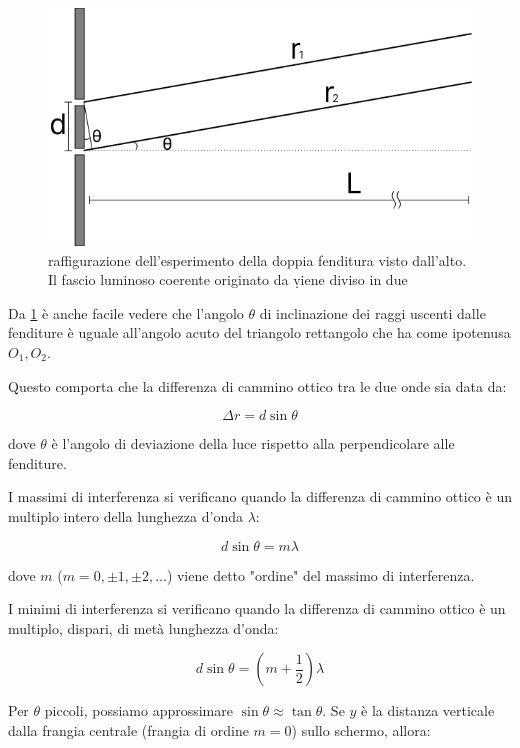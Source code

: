 \documentclass[12pt,a4paper]{report}
\begin{document}
\begin{figure}[!ht]
    \centering
    \includegraphics[width=\linewidth]{Immagini/double_slit_setup.png}
    \captionsetup{width=.8\linewidth}
    \caption{raffigurazione dell'esperimento della doppia fenditura visto dall'alto. Il fascio luminoso coerente originato da \d viene diviso in due }
    \label{fig:doubleSlitSetup}
\end{figure}

Da \cref{fig:doubleSlitSetup} è anche facile vedere che l'angolo \(\theta\) di inclinazione dei raggi uscenti dalle fenditure è uguale all'angolo acuto del triangolo rettangolo che ha come ipotenusa \(O_1, O_2 \).

Questo comporta che la differenza di cammino ottico tra le due onde sia data da:

\[ \Delta r = d \sin \theta \]

dove \(\theta\) è l'angolo di deviazione della luce rispetto alla perpendicolare alle fenditure.

I massimi di interferenza si verificano quando la differenza di cammino ottico è un multiplo intero della lunghezza d'onda \(\lambda\):
 
\[ d \sin \theta = m \lambda \]

dove \(m\) (\(m = 0, \pm 1, \pm 2, \ldots\)) viene detto "ordine" del massimo di interferenza.
  
I minimi di interferenza si verificano quando la differenza di cammino ottico è un multiplo, dispari, di metà lunghezza d'onda: 

\[ d \sin \theta = \left( m + \frac{1}{2} \right) \lambda \]

Per \(\theta\) piccoli, possiamo approssimare \(\sin \theta \approx \tan \theta\). Se \(y\) è la distanza verticale dalla frangia centrale (frangia di ordine \(m=0\)) sullo schermo, allora:
\end{document}
